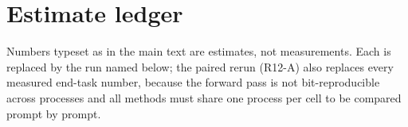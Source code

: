 \begin{table}[h]
\centering
\scriptsize
\setlength{\tabcolsep}{3pt}
\caption{Failure case: Llama-3.1-8B at 128k.  Error types are over single- and multi-key answers at $B\in\{2,3\}$ (80 per method).  \emph{Truncated}: the prediction is a proper prefix of at least three digits of the correct number.  \emph{Wrong needle}: another needle's value.}
\label{tab:app-fail}

\end{table}

\begin{table}[h]
\centering
\scriptsize
\setlength{\tabcolsep}{2.4pt}
\caption{Full end-task grid: mean score over 20 prompts per cell.  Bold marks the best method in each valid row.  $\ddagger$: uncompressed score below 0.9, excluded from every aggregate.  KIVI, KVQuant and H2O are added by the paired rerun (\S\ref{app:ledger}).}
\label{tab:app-grid}

\end{table}

\section{Estimate ledger}
\label{app:ledger}

Numbers typeset as  in the main text are estimates, not measurements.
Each is replaced by the run named below; the paired rerun (R12-A) also
replaces every measured end-task number, because the forward pass is not
bit-reproducible across processes and all methods must share one process per
cell to be compared prompt by prompt.

